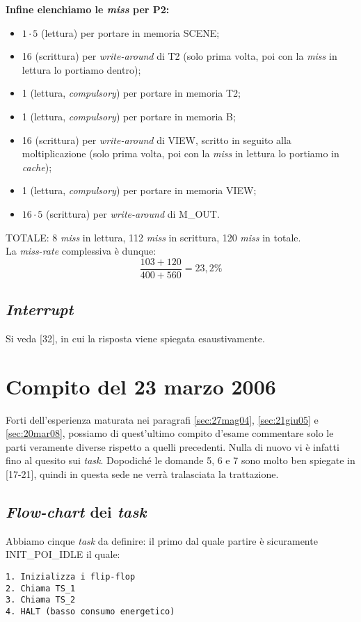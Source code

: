 \textbf{Infine elenchiamo le \textit{miss} per P2:}
\begin{itemize}
\item $1\cdot 5$ (lettura) per portare in memoria SCENE;
\item 16 (scrittura) per \textit{write-around} di T2 (solo prima volta, poi con la \textit{miss} in lettura lo portiamo dentro);
\item 1 (lettura, \textit{compulsory}) per portare in memoria T2;
\item 1 (lettura, \textit{compulsory}) per portare in memoria B;
\item 16 (scrittura) per \textit{write-around} di VIEW, scritto in seguito alla moltiplicazione (solo prima volta, poi con la \textit{miss} in lettura lo portiamo in \textit{cache});
\item 1 (lettura, \textit{compulsory}) per portare in memoria VIEW;
\item $16\cdot 5$ (scrittura) per \textit{write-around} di M\_OUT.
\end{itemize}
TOTALE: 8 \textit{miss} in lettura, 112 \textit{miss} in scrittura, 120 \textit{miss} in totale. \\

La \textit{miss-rate} complessiva è dunque:
\[
\dfrac{103+120}{400+560}=23,2\%
\]

\subsection{\textit{Interrupt}}
Si veda [32], in cui la risposta viene spiegata esaustivamente.

\section{Compito del 23 marzo 2006}
\label{sec:23mar06}

Forti dell'esperienza maturata nei paragrafi \ref{sec:27mag04}, \ref{sec:21giu05} e \ref{sec:20mar08}, possiamo di quest'ultimo compito d'esame commentare solo le parti veramente diverse rispetto a quelli precedenti.
Nulla di nuovo vi è infatti fino al quesito sui \textit{task}. Dopodiché le domande 5, 6 e 7 sono molto ben spiegate in [17-21], quindi in questa sede ne verrà tralasciata la trattazione.

\subsection{\textit{Flow-chart} dei \textit{task}}
Abbiamo cinque \textit{task} da definire: il primo dal quale partire è sicuramente INIT\_POI\_IDLE il quale:
\begin{verbatim}
1. Inizializza i flip-flop
2. Chiama TS_1
3. Chiama TS_2
4. HALT (basso consumo energetico)
\end{verbatim}

